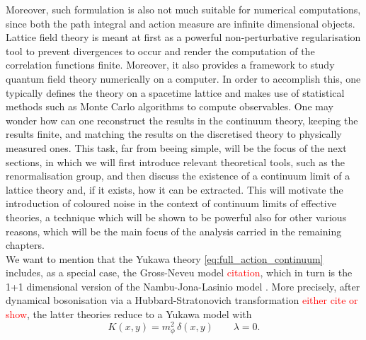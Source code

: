 Moreover, such formulation is also not much suitable for numerical computations, since both the path integral and action measure are infinite dimensional objects. \\
Lattice field theory \cite{Montvay1994QuantumLattice,rothe_LGT,gattringer_LQCD,creutz_2023} is meant at first as a powerful non-perturbative regularisation tool to prevent divergences to occur and render the computation of the correlation functions finite. Moreover, it also provides a framework to study quantum field theory numerically on a computer. In order to accomplish this, one typically defines the theory on a spacetime lattice and makes use of statistical methods such as Monte Carlo algorithms to compute observables. One may wonder how can one reconstruct the results in the continuum theory, keeping the results finite, and matching the results on the discretised theory to physically measured ones. This task, far from beeing simple, will be the focus of the next sections, in which we will first introduce relevant theoretical tools, such as the renormalisation group, and then discuss the existence of a continuum limit of a lattice theory and, if it exists, how it can be extracted. This will motivate the introduction of coloured noise in the context of continuum limits of effective theories, a technique which will be shown to be powerful also for other various reasons, which will be the main focus of the analysis carried in the remaining chapters. \\
We want to mention that the Yukawa theory \eqref{eq:full_action_continuum} includes, as a special case, the Gross-Neveu model \textcolor{red}{citation}, which in turn is the 1+1 dimensional version of the Nambu-Jona-Lasinio model \cite{Nambu1961DynamicalI, Nambu1961DynamicalII}.
More precisely, after dynamical bosonisation via a Hubbard-Stratonovich transformation \textcolor{red}{either cite or show}, the latter theories reduce to a Yukawa model with 
\begin{equation*}
    K(x,y) = m_\phi^2 \, \delta(x,y) \qquad \lambda = 0.
\end{equation*}
